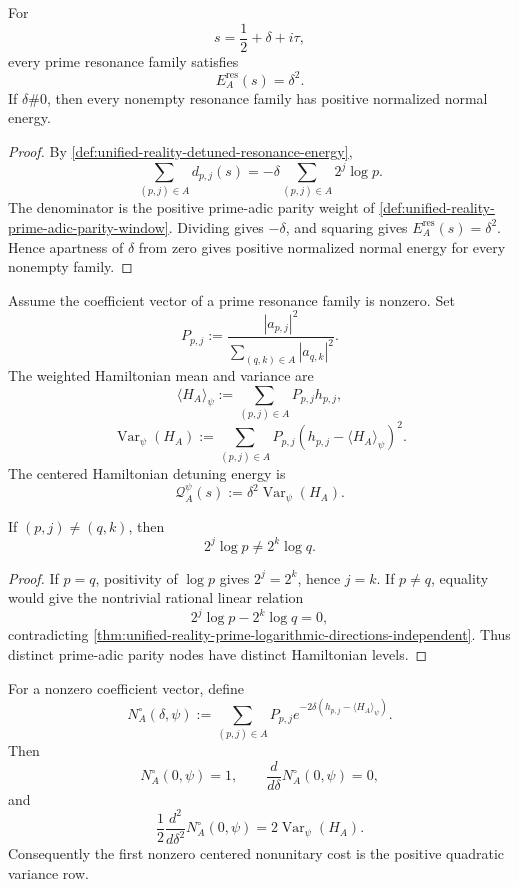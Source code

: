 \begin{theorem}
\label{thm:unified-reality-detuned-resonance-reads-normal-coordinate}
For
$$
s=\frac12+\delta+i\tau,
$$
every prime resonance family satisfies
$$
E_A^{\mathrm{res}}(s)=\delta^2.
$$
If $\delta\#0$, then every nonempty resonance family has positive
normalized normal energy.
\end{theorem}

\begin{proof}
By
\autoref{def:unified-reality-detuned-resonance-energy},
$$
\sum_{(p,j)\in A}d_{p,j}(s)
=
-\delta
\sum_{(p,j)\in A}2^j\log p.
$$
The denominator is the positive prime-adic parity weight of
\autoref{def:unified-reality-prime-adic-parity-window}.  Dividing gives
$-\delta$, and squaring gives $E_A^{\mathrm{res}}(s)=\delta^2$.  Hence
apartness of $\delta$ from zero gives positive normalized normal energy
for every nonempty family.
\end{proof}

\begin{definition}
\label{def:unified-reality-centered-hamiltonian-variance-energy}
Assume the coefficient vector of a prime resonance family is nonzero.
Set
$$
P_{p,j}
:=
\frac{|a_{p,j}|^2}
{\sum_{(q,k)\in A}|a_{q,k}|^2}.
$$
The weighted Hamiltonian mean and variance are
$$
\langle H_A\rangle_{\psi}
:=
\sum_{(p,j)\in A}P_{p,j}h_{p,j},
$$
$$
\operatorname{Var}_{\psi}(H_A)
:=
\sum_{(p,j)\in A}
P_{p,j}
\left(h_{p,j}-\langle H_A\rangle_{\psi}\right)^2.
$$
The centered Hamiltonian detuning energy is
$$
\mathcal Q_A^{\psi}(s)
:=
\delta^2\operatorname{Var}_{\psi}(H_A).
$$
\end{definition}

\begin{theorem}
\label{thm:unified-reality-prime-hamiltonian-levels-separated}
If $(p,j)\ne(q,k)$, then
$$
2^j\log p\ne2^k\log q.
$$
\end{theorem}

\begin{proof}
If $p=q$, positivity of $\log p$ gives $2^j=2^k$, hence $j=k$.  If
$p\ne q$, equality would give the nontrivial rational linear relation
$$
2^j\log p-2^k\log q=0,
$$
contradicting
\autoref{thm:unified-reality-prime-logarithmic-directions-independent}.
Thus distinct prime-adic parity nodes have distinct Hamiltonian levels.
\end{proof}

\begin{theorem}
\label{thm:unified-reality-centered-nonunitary-cost-variance-energy}
For a nonzero coefficient vector, define
$$
N_A^{\circ}(\delta,\psi)
:=
\sum_{(p,j)\in A}
P_{p,j}
e^{-2\delta(h_{p,j}-\langle H_A\rangle_{\psi})}.
$$
Then
$$
N_A^{\circ}(0,\psi)=1,
\qquad
\frac{d}{d\delta}N_A^{\circ}(0,\psi)=0,
$$
and
$$
\frac{1}{2}
\frac{d^2}{d\delta^2}N_A^{\circ}(0,\psi)
=
2\operatorname{Var}_{\psi}(H_A).
$$
Consequently the first nonzero centered nonunitary cost is the positive
quadratic variance row.
\end{theorem}

